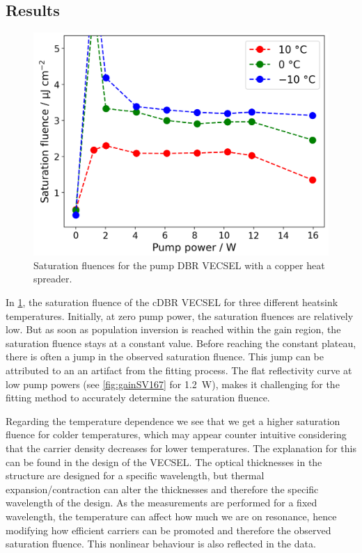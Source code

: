 \subsection*{Results}

\begin{figure}
    \vspace{-\baselineskip}
    \centering
    \includegraphics[width=.98\textwidth]{images/param0.png}
    \caption{Saturation fluences for the pump DBR VECSEL with a copper heat spreader.}
    \label{fig:fsat}
\end{figure}
In \cref{fig:fsat}, the saturation fluence of the cDBR VECSEL for three different heatsink temperatures.
Initially, at zero pump power, the saturation fluences are relatively low. But as soon as population inversion is reached within the gain region, the saturation fluence stays at a constant value. Before reaching the constant plateau, there is often a jump in the observed saturation fluence. This jump can be attributed to an an artifact from the fitting process. The flat reflectivity curve at low pump powers (see \cref{fig:gainSV167} for \qty{1.2}{\W}), makes it challenging for the fitting method to accurately determine the saturation fluence.

Regarding the temperature dependence we see that we get a higher saturation fluence for colder temperatures, which may appear counter intuitive considering that the carrier density decreases for lower temperatures. The explanation for this can be found in the design of the VECSEL. The optical thicknesses in the structure are designed for a specific wavelength, but thermal expansion/contraction can alter the thicknesses and therefore the specific wavelength of the design. %
As the measurements are performed for a fixed wavelength, the temperature can affect how much we are on resonance, hence modifying how efficient carriers can be promoted and therefore the observed saturation fluence. This nonlinear behaviour is also reflected in the data.


